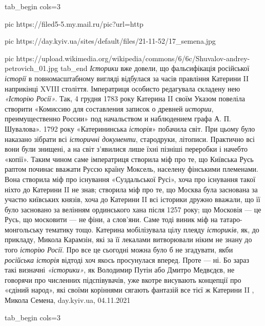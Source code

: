 \ifcmt

\ifcmt
  tab_begin cols=3

     pic https://filed5-5.my.mail.ru/pic?url=http%

  	 pic https://day.kyiv.ua/sites/default/files/21-11-52/17_semena.jpg

		 pic https://upload.wikimedia.org/wikipedia/commons/6/6c/Shuvalov-andrey-petrovich_01.jpg
  tab_end
\fi
\emph{Історики} вже довели, що фальсифікація російської \emph{історії} в повномасштабному
вигляді відбулася за часів правління Катерини II наприкінці XVIII століття.
Імператриця особисто редагувала складену нею \emph{«Історію Росії»}. Так, 4 грудня
1783 року Катерина II своїм Указом повеліла створити «Комиссию для составления
записок о древней \emph{истории}, преимущественно России» под начальством и
наблюдением графа А. П. Шувалова». 1792 року «Катерининська \emph{історія}» побачила
світ. При цьому було наказано зібрати всі \emph{історичні документи}, стародруки,
літописи. Практично всі вони були знищені, а на світ з’явилися лише їхні
пізніші переробки і начебто «копії». Таким чином саме імператриця створила міф
про те, що Київська Русь раптом починає вважати Руссю країну Моксель, населену
фінськими племенами. Вона створила міф про існування «Суздальської Русі», хоча
про існування такої ніхто до Катерини II не знав; створила міф про те, що
Москва була заснована за участю київських князів, хоча до Катерини II всі
історики дружно вважали, що її було засновано за велінням ординського хана
після 1257 року; що Московія — це Русь, що московити — не фіни, а слов’яни.
Саме тоді виник міф на татаро-монгольську тематику тощо. Катерина мобілізувала
цілу плеяду \emph{істориків}, як, до прикладу, Микола Карамзін, які за її лекалами
витворювали ніким не знану до того \emph{історію Росії}. Про все це сьогодні можна
було б не згадувати, якби \emph{російська історія} відтоді хоч якось просунулася
вперед. Проте — ні. Бо зараз такі визначні \emph{«історики»}, як Володимир Путін або
Дмитро Медвєдєв, не говорячи про численних підспівувачів, уже вкотре висувають
концепції про «єдіний народ», які своїми коріннями сягають фантазій все тієї ж
Катерини II
, 
Микола Семена, day.kyiv.ua, 04.11.2021

\ifcmt
  tab_begin cols=3

